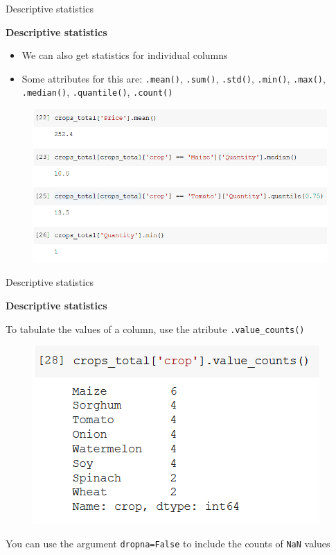 \documentclass[aspectratio=169]{beamer}
\begin{document}
\begin{frame}{Descriptive statistics}

	\textbf{Descriptive statistics}

	\begin{multicols}{2}

		\begin{itemize}
			\item We can also get statistics for individual columns
			\item Some attributes for this are: \texttt{.mean()}, \texttt{.sum()}, \texttt{.std()}, \texttt{.min()}, \texttt{.max()}, \texttt{.median()}, \texttt{.quantile()}, \texttt{.count()}
		\end{itemize}

		\begin{figure}
			\centering
			\includegraphics[width=\linewidth]{img/desc_stats.png}
		\end{figure}

	\end{multicols}

\end{frame}

\begin{frame}{Descriptive statistics}

	\textbf{Descriptive statistics}

	To tabulate the values of a column, use the atribute \texttt{.value\_counts()}

	\begin{figure}
		\centering
		\includegraphics[width=0.5\linewidth]{img/value_counts.png}
	\end{figure}

	You can use the argument \texttt{dropna=False} to include the counts of \texttt{NaN} values

\end{frame}
\end{document}
